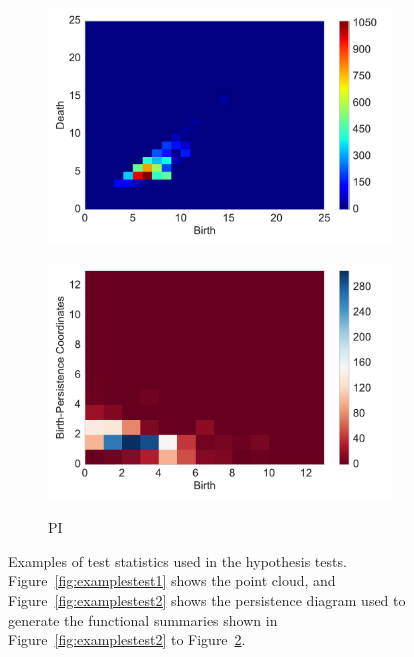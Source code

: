 \documentclass[12pt]{article}
\newcommand{\figref}[1]{Figure~\ref{#1}}
\begin{document}
\begin{figure}[htbp]
\begin{subfigure}{.24\textwidth}
        \includegraphics[width=\linewidth]{figure_5_intensity_fun.pdf}
    \label{fig:examplestest7}
  \end{subfigure}
    \begin{subfigure}{.24\textwidth}
    \centering
        \caption{PI}
        \includegraphics[width=\linewidth]{figure_5_pimage_fun.pdf}
    \label{fig:examplestest8}
  \end{subfigure}
   \caption{Examples of test statistics used in the hypothesis tests. \figref{fig:examplestest1} shows the point cloud, and \figref{fig:examplestest2} shows the persistence diagram used to generate the functional summaries shown in \figref{fig:examplestest2} to \figref{fig:examplestest8}.}
   \label{fig:examples}
\end{figure}

\end{document}
